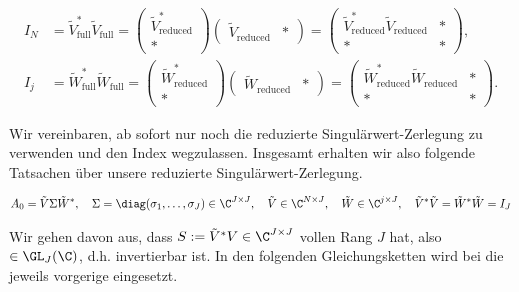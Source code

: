 \begin{align*}
    I_N
    & =
    \tilde V_\mathrm{full}^\ast \tilde V_\mathrm{full}
    =
    \begin{pmatrix}
        \tilde V_\mathrm{reduced}^\ast \\ \ast
    \end{pmatrix}
    \begin{pmatrix}
        \tilde V_\mathrm{reduced} & \ast
    \end{pmatrix}
    =
    \begin{pmatrix}
        \tilde V_\mathrm{reduced}^\ast \tilde V_\mathrm{reduced} & \ast \\
        \ast                                                     & \ast
    \end{pmatrix}, \\
    I_j
    & =
    \tilde W_\mathrm{full}^\ast \tilde W_\mathrm{full}
    =
    \begin{pmatrix}
        \tilde W_\mathrm{reduced}^\ast \\ \ast
    \end{pmatrix}
    \begin{pmatrix}
        \tilde W_\mathrm{reduced} & \ast
    \end{pmatrix}
    =
    \begin{pmatrix}
        \tilde W_\mathrm{reduced}^\ast \tilde W_\mathrm{reduced} & \ast \\
        \ast                                                     & \ast
    \end{pmatrix}.
\end{align*}

Wir vereinbaren, ab sofort nur noch die reduzierte Singulärwert-Zerlegung zu verwenden und den Index wegzulassen.
Insgesamt erhalten wir also folgende Tatsachen über unsere reduzierte Singulärwert-Zerlegung.

\begin{align} \label{eq:singulärwert_zerlegung}
    A_0 = \tilde V \Sigma \tilde W^\ast,
    \quad
    \Sigma = \diag(\sigma_1, \dots, \sigma_J) \in \C^{J \times J},
    \quad
    \tilde V \in \C^{N \times J},
    \quad
    \tilde W \in \C^{j \times J},
    \quad
    \tilde V^\ast \tilde V
    =
    \tilde W^\ast \tilde W
    =
    I_J
\end{align}

Wir gehen davon aus, dass $S := \tilde V^\ast V \in \C^{J \times J}$ vollen Rang $J$ hat, also $\in \GL_J(\C)$, d.h. invertierbar ist.
In den folgenden Gleichungsketten wird bei \Quote{!} die jeweils vorgerige eingesetzt.

